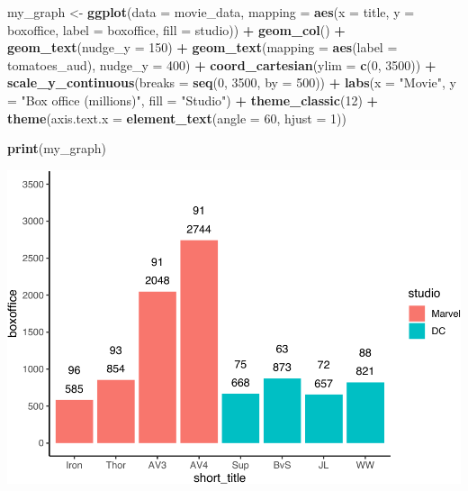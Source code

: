 \documentclass[
]{krantz}
\makeatletter
\newenvironment{Shaded}{\begin{snugshade}}{\end{snugshade}}
\newcommand{\DataTypeTok}[1]{\textcolor[rgb]{0.27,0.27,0.27}{#1}}
\newcommand{\DecValTok}[1]{\textcolor[rgb]{0.06,0.06,0.06}{#1}}
\newcommand{\KeywordTok}[1]{\textcolor[rgb]{0.27,0.27,0.27}{\textbf{#1}}}
\newcommand{\NormalTok}[1]{#1}
\newcommand{\OperatorTok}[1]{\textcolor[rgb]{0.43,0.43,0.43}{\textbf{#1}}}
\newcommand{\StringTok}[1]{\textcolor[rgb]{0.5,0.5,0.5}{#1}}
\newenvironment{kframe}{%
\medskip{}
\setlength{\fboxsep}{.8em}
 \def\at@end@of@kframe{}%
 \ifinner\ifhmode%
  \def\at@end@of@kframe{\end{minipage}}%
  \begin{minipage}{\columnwidth}%
 \fi\fi%
 \def\FrameCommand##1{\hskip\@totalleftmargin \hskip-\fboxsep
 \colorbox{shadecolor}{##1}\hskip-\fboxsep
     \hskip-\linewidth \hskip-\@totalleftmargin \hskip\columnwidth}%
 \MakeFramed {\advance\hsize-\width
   \@totalleftmargin\z@ \linewidth\hsize
   \@setminipage}}%
 {\par\unskip\endMakeFramed%
 \at@end@of@kframe}
\renewenvironment{Shaded}{\begin{kframe}}{\end{kframe}}
\makeatother
\begin{document}
\begin{Shaded}
\begin{Highlighting}[]
\NormalTok{my_graph <-}\StringTok{ }\KeywordTok{ggplot}\NormalTok{(}\DataTypeTok{data =}\NormalTok{ movie_data,}
           \DataTypeTok{mapping =} \KeywordTok{aes}\NormalTok{(}\DataTypeTok{x =}\NormalTok{ title,}
                         \DataTypeTok{y =}\NormalTok{ boxoffice,}
                         \DataTypeTok{label =}\NormalTok{ boxoffice, }
                         \DataTypeTok{fill =}\NormalTok{ studio)) }\OperatorTok{+}
\StringTok{  }\KeywordTok{geom_col}\NormalTok{() }\OperatorTok{+}
\StringTok{  }\KeywordTok{geom_text}\NormalTok{(}\DataTypeTok{nudge_y =} \DecValTok{150}\NormalTok{)  }\OperatorTok{+}
\StringTok{  }\KeywordTok{geom_text}\NormalTok{(}\DataTypeTok{mapping =} \KeywordTok{aes}\NormalTok{(}\DataTypeTok{label =}\NormalTok{ tomatoes_aud), }
            \DataTypeTok{nudge_y =} \DecValTok{400}\NormalTok{) }\OperatorTok{+}
\StringTok{  }\KeywordTok{coord_cartesian}\NormalTok{(}\DataTypeTok{ylim =} \KeywordTok{c}\NormalTok{(}\DecValTok{0}\NormalTok{, }\DecValTok{3500}\NormalTok{)) }\OperatorTok{+}
\StringTok{  }\KeywordTok{scale_y_continuous}\NormalTok{(}\DataTypeTok{breaks =} \KeywordTok{seq}\NormalTok{(}\DecValTok{0}\NormalTok{, }\DecValTok{3500}\NormalTok{, }\DataTypeTok{by =} \DecValTok{500}\NormalTok{)) }\OperatorTok{+}
\StringTok{  }\KeywordTok{labs}\NormalTok{(}\DataTypeTok{x =} \StringTok{"Movie"}\NormalTok{,}
       \DataTypeTok{y =} \StringTok{"Box office (millions)"}\NormalTok{,}
       \DataTypeTok{fill =} \StringTok{"Studio"}\NormalTok{) }\OperatorTok{+}
\StringTok{  }\KeywordTok{theme_classic}\NormalTok{(}\DecValTok{12}\NormalTok{) }\OperatorTok{+}
\StringTok{  }\KeywordTok{theme}\NormalTok{(}\DataTypeTok{axis.text.x =} \KeywordTok{element_text}\NormalTok{(}\DataTypeTok{angle =} \DecValTok{60}\NormalTok{, }
                                   \DataTypeTok{hjust =} \DecValTok{1}\NormalTok{))  }

\KeywordTok{print}\NormalTok{(my_graph)}
\end{Highlighting}
\end{Shaded}

\includegraphics[width=0.65\linewidth]{bookdown_files/figure-latex/unnamed-chunk-271-1}
\end{document}
